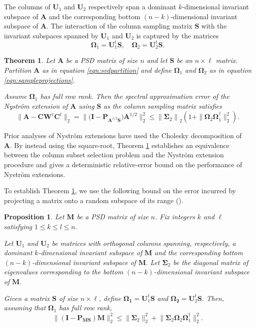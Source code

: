 \documentclass[11pt,letterpaper,twoside,reqno,nosumlimits]{amsart}
\newcommand{\mat}[1]{\ensuremath{\bm{#1}}}
\newcommand{\norm}[1]{\ensuremath{\big\|#1\big\|}}
\newtheorem{thm}{Theorem}
\newtheorem{prop}{Proposition}
\theoremstyle{remark}
\begin{document}
The columns of $\mat{U}_1$ and $\mat{U}_2$ respectively span a dominant $k$-dimensional invariant subspace of $\mat{A}$ and the corresponding bottom $(n-k)$-dimensional invariant subspace of $\mat{A}.$ The interaction of the column sampling matrix $\mat{S}$ with the invariant subspaces spanned by $\mat{U}_1$ and $\mat{U}_2$ is captured by the matrices
\begin{equation}
 \mat{\Omega}_1 = \mat{U}_1^t \mat{S}, \quad \mat{\Omega}_2 = \mat{U}_2^t \mat{S}.
\label{eqn:sampleprojections}
\end{equation}

\begin{thm}
Let $\mat{A}$ be a PSD matrix of size $n$ and let $\mat{S}$ be an $n \times \ell$ matrix. Partition $\mat{A}$ as in equation \eqref{eqn:svdpartition} and define $\mat{\Omega}_1$ and $\mat{\Omega}_2$ as in equation \eqref{eqn:sampleprojections}.

Assume $\mat{\Omega}_1$ has full row rank. Then the spectral approximation error of the Nystr\"om extension of $\mat{A}$ using $\mat{S}$ as the column sampling matrix satisfies
\begin{equation}
\|\mat{A} - \mat{C}\mat{W}^\dagger \mat{C}^t\|_2 = \|\big(\mat{I} - \mat{P}_{\mat{A}^{1/2} \mat{S}}\big)\mat{A}^{1/2}\|_2^2 \leq \norm{\mat{\Sigma}_2}_2 \left( 1 + \|\mat{\Omega}_2 \mat{\Omega}_1^\dagger\|_2^2\right).
  \label{eqn:spectralnystromerrbound}
\end{equation}
\label{thm:colselection}
\end{thm}
Prior analyses of Nystr\"om extensions have used the Cholesky decomposition of $\mat{A}.$ By instead using the square-root, Theorem \ref{thm:colselection} establishes an equivalence between the column subset selection problem and the Nystr\"om extension procedure and gives a deterministic relative-error bound on the performance of Nystr\"om extensions. 

To establish Theorem \ref{thm:colselection}, we use the following bound on the error incurred by projecting a matrix onto a random subspace of its range (\cite[Theorem 9.1]{HMT11}).

\begin{prop}
 Let $\mat{M}$ be a PSD matrix of size $n$. Fix integers $k$ and $\ell$ satisfying $1 \leq k \leq l \leq n.$ 

Let $\mat{U}_1$ and $\mat{U}_2$ be matrices with orthogonal columns spanning, respectively, a dominant $k$-dimensional invariant subspace of $\mat{M}$ and the corresponding bottom $(n-k)$-dimensional invariant subspace of $\mat{M}.$ Let $\mat{\Sigma}_2$ be the diagonal matrix of eigenvalues corresponding to the bottom $(n-k)$-dimensional invariant subspace of $\mat{M}.$ 

Given a matrix $\mat{S}$ of size $n \times \ell$, define $\mat{\Omega_1} = \mat{U}_1^t \mat{S}$ and $\mat{\Omega_2} = \mat{U}_2^t \mat{S}.$ Then, assuming that $\mat{\Omega}_1$ has full row rank,
\[
\| (\mat{I} - \mat{P}_{\mat{M}\mat{S}}) \mat{M} \|_2^2 \leq \| \mat{\Sigma}_2 \|_2^2 + \big\| \mat{\Sigma}_2 \mat{\Omega}_2 \mat{\Omega}_1^\dagger \big \|_2^2.
\]
 \label{prop:deterministicerrorbound}
\end{prop}
\end{document}
